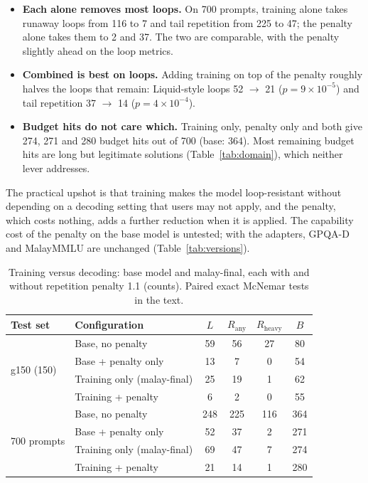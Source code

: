 \documentclass[11pt]{article}
\newcommand{\Rany}{R_{\text{any}}}
\newcommand{\Rheavy}{R_{\text{heavy}}}
\begin{document}
\begin{itemize}
  \item \textbf{Each alone removes most loops.} On 700 prompts, training alone takes runaway loops from 116 to 7 and tail repetition from 225 to 47; the penalty alone takes them to 2 and 37. The two are comparable, with the penalty slightly ahead on the loop metrics.
  \item \textbf{Combined is best on loops.} Adding training on top of the penalty roughly halves the loops that remain: Liquid-style loops 52 $\rightarrow$ 21 ($p=9\times10^{-5}$) and tail repetition 37 $\rightarrow$ 14 ($p=4\times10^{-4}$).
  \item \textbf{Budget hits do not care which.} Training only, penalty only and both give 274, 271 and 280 budget hits out of 700 (base: 364). Most remaining budget hits are long but legitimate solutions (Table~\ref{tab:domain}), which neither lever addresses.
\end{itemize}

The practical upshot is that training makes the model loop-resistant without depending on a decoding setting that users may not apply, and the penalty, which costs nothing, adds a further reduction when it is applied. The capability cost of the penalty on the base model is untested; with the adapters, GPQA-D and MalayMMLU are unchanged (Table~\ref{tab:versions}).

\begin{table}[t]
\centering
\small
\caption{Training versus decoding: base model and malay-final, each with and without repetition penalty 1.1 (counts). Paired exact McNemar tests in the text.}
\label{tab:decoding}
\setlength{\tabcolsep}{5pt}
\begin{tabular}{llcccc}
\toprule
Test set & Configuration & $L$ & $\Rany$ & $\Rheavy$ & $B$ \\
\midrule
\multirow{4}{*}{g150 (150)} & Base, no penalty & 59 & 56 & 27 & 80 \\
 & Base + penalty only & 13 & 7 & 0 & 54 \\
 & Training only (malay-final) & 25 & 19 & 1 & 62 \\
 & Training + penalty & 6 & 2 & 0 & 55 \\
\midrule
\multirow{4}{*}{700 prompts} & Base, no penalty & 248 & 225 & 116 & 364 \\
 & Base + penalty only & 52 & 37 & 2 & 271 \\
 & Training only (malay-final) & 69 & 47 & 7 & 274 \\
 & Training + penalty & 21 & 14 & 1 & 280 \\
\bottomrule
\end{tabular}
\end{table}
\end{document}
